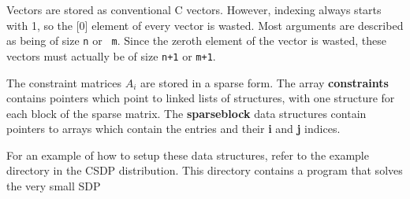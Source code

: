 \documentclass{article}
\begin{document}
Vectors are stored as conventional C vectors.  However, indexing
always starts with 1, so the [0] element of every vector is wasted.
Most arguments are described as being of size {\tt n} or {\tt
m}.  Since the zeroth element of the vector is wasted, these
vectors must actually be of size {\tt n+1} or {\tt m+1}.

The constraint matrices $A_{i}$ are stored in a sparse form.  The array
{\bf constraints} contains pointers which point to linked lists of
structures, with one structure for each block of the sparse matrix.
The {\bf sparseblock} data structures contain pointers to arrays which
contain the entries and their {\bf i} and {\bf j} indices.

For an example of how to setup these data structures, refer to the 
example directory in the CSDP distribution. 
This directory contains a program that solves the very
small SDP
\end{document}
